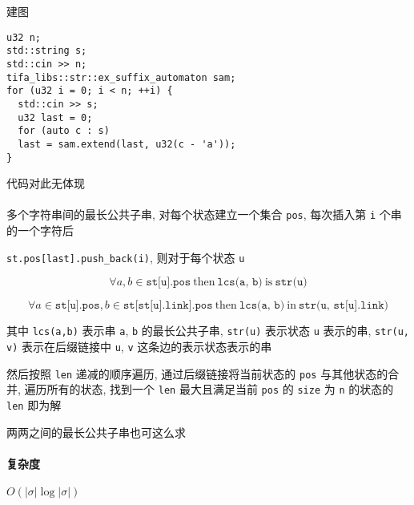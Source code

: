 建图

\begin{verbatim}
u32 n;
std::string s;
std::cin >> n;
tifa_libs::str::ex_suffix_automaton sam;
for (u32 i = 0; i < n; ++i) {
  std::cin >> s;
  u32 last = 0;
  for (auto c : s)
  last = sam.extend(last, u32(c - 'a'));
}
\end{verbatim}

代码对此无体现\\
\\

多个字符串间的最长公共子串, 对每个状态建立一个集合 \verb|pos|, 每次插入第 \verb|i| 个串的一个字符后

\verb|st.pos[last].push_back(i)|, 则对于每个状态 \verb|u|

\[
    \forall a,b \in \texttt{st[u].pos}~\text{then}~\texttt{lcs(a, b)}~\text{is}~\texttt{str(u)}
\]

\[
    \forall a\in \texttt{st[u].pos}, b\in \texttt{st[st[u].link].pos}~\text{then}~\texttt{lcs(a, b)} ~\text{in}~ \texttt{str(u, st[u].link)}
\]

其中 \verb|lcs(a,b)| 表示串 \verb|a|, \verb|b| 的最长公共子串, \verb|str(u)| 表示状态 \verb|u| 表示的串, \verb|str(u, v)| 表示在后缀链接中 \verb|u|, \verb|v| 这条边的表示状态表示的串

然后按照 \verb|len| 递减的顺序遍历, 通过后缀链接将当前状态的 \verb|pos| 与其他状态的合并, 遍历所有的状态, 找到一个 \verb|len| 最大且满足当前 \verb|pos| 的 \verb|size| 为 \verb|n| 的状态的 \verb|len| 即为解

两两之间的最长公共子串也可这么求

\paragraph{复杂度}

\(O(|\sigma| \log|\sigma|)\)
